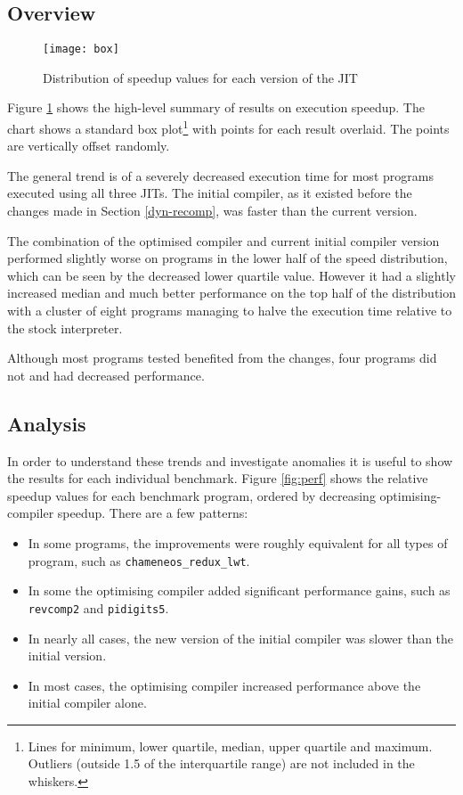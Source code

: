 \subsection{Overview}

\begin{figure}[h]
      \texttt{[image: box]}
      \caption{Distribution of speedup values for each version of the JIT}
      \label{fig:box}
\end{figure}

Figure \ref{fig:box} shows the high-level summary of results on execution speedup. The
chart shows a standard box plot\footnote{Lines for minimum, lower quartile, median, upper quartile
      and maximum. Outliers (outside
      1.5 of the interquartile range) are not included in the whiskers.}
with points for each result overlaid. The points are vertically
offset randomly.

The general trend is of a severely decreased execution time for most programs executed using all
three JITs. The initial compiler, as it existed before the changes made in Section
\ref{dyn-recomp},
was faster than the current version.

The combination of the optimised compiler and current initial compiler version performed slightly
worse on programs in the lower half of the speed distribution, which can be seen by the decreased
lower quartile value.  However it had a slightly increased median and much better performance on
the
top half of the distribution with a cluster of eight programs managing to halve the execution time
relative to the stock interpreter.

Although most programs tested benefited from the changes, four programs did not and had decreased
performance.

\subsection{Analysis}

In order to understand these trends and investigate anomalies it is useful to show the results for
each individual benchmark. Figure \ref{fig:perf} shows the relative speedup values for each
benchmark program, ordered by decreasing optimising-compiler speedup. There are a few patterns:

\begin{itemize}
      \item In some programs, the improvements were roughly equivalent for all types of
            program, such as \texttt{chameneos\_redux\_lwt}.
      \item In some the optimising compiler added significant performance gains, such as
            \texttt{revcomp2} and \texttt{pidigits5}.
      \item In nearly all cases, the new version of the initial compiler was slower than the
            initial
            version.
      \item In most cases, the optimising compiler increased performance above the initial compiler
            alone.
\end{itemize}

